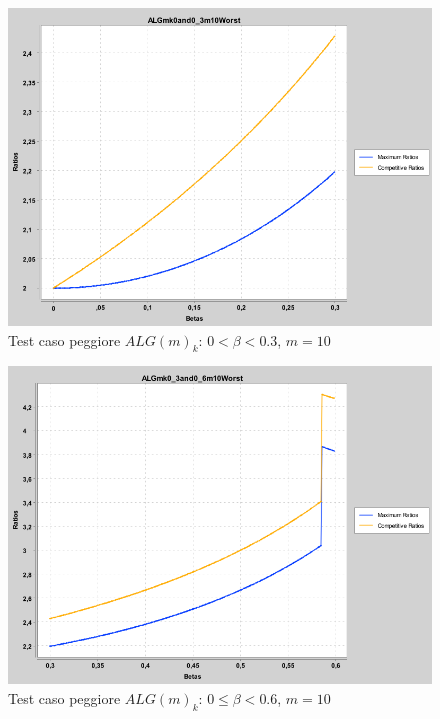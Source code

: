 \documentclass[12pt]{article}
\begin{document}
\begin{figure}[H]
\caption{Test caso peggiore $ALG(m)_{k}$: $0 < \beta < 0.3$, $m = 10$}
\centering
\includegraphics[scale=0.4]{max/ALGmk0and0_3m10Worst.png}
\end{figure}
\begin{figure}[H]
\caption{Test caso peggiore $ALG(m)_{k}$: $0 \leq \beta < 0.6$, $m = 10$}
\centering
\includegraphics[scale=0.4]{max/ALGmk0_3and0_6m10Worst.png}
\end{figure}
\end{document}
